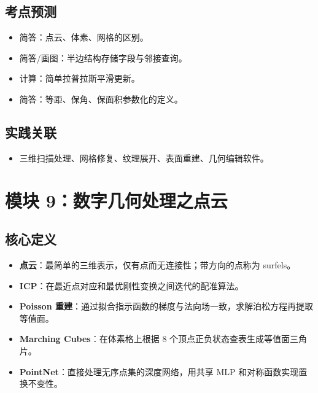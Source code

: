 \documentclass[UTF8,zihao=-4,scheme=chinese,fontset=fandol]{ctexart}
\newcommand{\key}[1]{\textbf{#1}}
\begin{document}
\subsection{考点预测}
\begin{itemize}
  \item 简答：点云、体素、网格的区别。
  \item 简答/画图：半边结构存储字段与邻接查询。
  \item 计算：简单拉普拉斯平滑更新。
  \item 简答：等距、保角、保面积参数化的定义。
\end{itemize}

\subsection{实践关联}
\begin{itemize}
  \item 三维扫描处理、网格修复、纹理展开、表面重建、几何编辑软件。
\end{itemize}

\section{模块 9：数字几何处理之点云}

\subsection{核心定义}
\begin{itemize}
  \item \key{点云}：最简单的三维表示，仅有点而无连接性；带方向的点称为 surfels。
  \item \key{ICP}：在最近点对应和最优刚性变换之间迭代的配准算法。
  \item \key{Poisson 重建}：通过拟合指示函数的梯度与法向场一致，求解泊松方程再提取等值面。
  \item \key{Marching Cubes}：在体素格上根据 8 个顶点正负状态查表生成等值面三角片。
  \item \key{PointNet}：直接处理无序点集的深度网络，用共享 MLP 和对称函数实现置换不变性。
\end{itemize}
\end{document}
